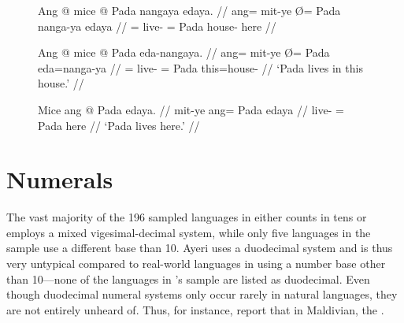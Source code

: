 \begin{figure}[h]
\pex
\a\ljudge*\label{ex:edayamod}\begingl
	\gla Ang @ mice {} @ Pada nangaya edaya. //
	\glb ang= mit-ye Ø= Pada nanga-ya edaya //
	\glc \AgtT{}= live-\TsgF{} \Top{}= Pada house-\Loc{} here //
\endgl

\a\label{ex:edanp}\begingl
	\gla Ang @ mice {} @ Pada eda-nangaya. //
	\glb ang= mit-ye Ø= Pada eda=nanga-ya //
	\glc \AgtT{}= live-\TsgF{} \Top{}= Pada this=house-\Loc{} //
	\glft `Pada lives in this house.' //
\endgl

\a\label{ex:edanyapro}\begingl
	\gla Mice ang @ Pada edaya. //
	\glb mit-ye ang= Pada edaya //
	\glc live-\TsgF{} \Aarg{}= Pada here //
	\glft `Pada lives here.' //
\endgl
\xe
\end{figure}



\section{Numerals}
\label{sec:numerals}

The vast majority of the 196 sampled languages in \citet{wals131} either counts
in tens or employs a mixed vigesimal-decimal system, while only five languages
in the sample use a different base than 10. Ayeri uses a duodecimal system and
is thus very untypical compared to real-world languages in using a number base
other than 10---none of the languages in \citet{wals131}'s sample are listed as
duodecimal.
Even though duodecimal numeral systems only occur rarely in natural languages,
they are not entirely unheard of. Thus, for instance, \citet{caingair2000}
report that in Maldivian, the .

